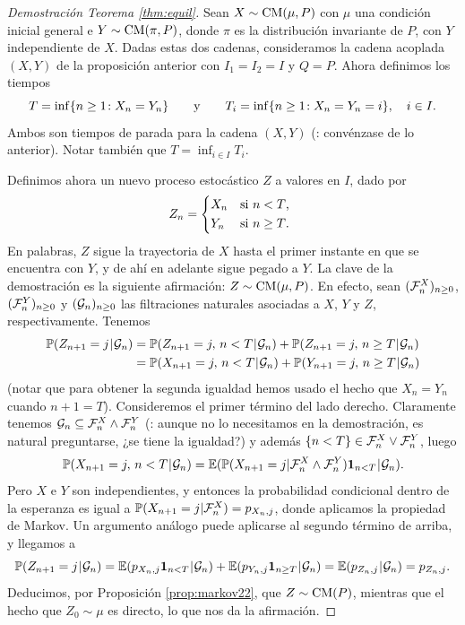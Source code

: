 \begin{proof}[Demostración Teorema \ref{thm:equil}]
Sean $X\sim\text{\upshape{CM}}(\mu,P)$ con $\mu$ una condición inicial general e $Y\sim\text{\upshape{CM}}(\pi,P)$, donde $\pi$ es la distribución invariante de $P$, con $Y$ independiente de $X$.
Dadas estas dos cadenas, consideramos la cadena acoplada $(X,Y)$ de la proposición anterior con $I_1=I_2=I$ y $Q=P$.
Ahora definimos los tiempos
\[T=\inf\{n\geq1\!:X_n=Y_n\}\qquad\text{\upshape{y}}\qquad T_i=\inf\{n\geq1\!:X_n=Y_n=i\},\quad i\in I.\]
Ambos son tiempos de parada para la cadena $(X,Y)$ (\uexers: convénzase de lo anterior).
Notar también que $T=\inf_{i\in I}T_i$.

Definimos ahora un nuevo proceso estocástico $Z$ a valores en $I$, dado por
\[Z_n=\begin{dcases*}
X_n & si $n<T$,\\
Y_n & si $n\geq T$.
\end{dcases*}\]
En palabras, $Z$ sigue la trayectoria de $X$ hasta el primer instante en que se encuentra con $Y$, y de ahí en adelante sigue pegado a $Y$.
La clave de la demostración es la siguiente afirmación: $Z\sim\text{\upshape{CM}}(\mu,P)$.
En efecto, sean $(\mathcal{F}^X_n)_{n\geq0}$, $(\mathcal{F}^Y_n)_{n\geq0}$ y $(\mathcal{G}_n)_{n\geq0}$ las filtraciones naturales asociadas a $X$, $Y$ y $Z$, respectivamente.
Tenemos
\begin{align}
\mathbb{P}(Z_{n+1}=j\hspace{0.05em}|\hspace{0.05em}\mathcal{G}_n)&=\mathbb{P}(Z_{n+1}=j,\,n<T\hspace{0.05em}|\hspace{0.05em}\mathcal{G}_n)+\mathbb{P}(Z_{n+1}=j,\,n\geq T\hspace{0.05em}|\hspace{0.05em}\mathcal{G}_n)\\
&=\mathbb{P}(X_{n+1}=j,\,n<T\hspace{0.05em}|\hspace{0.05em}\mathcal{G}_n)+\mathbb{P}(Y_{n+1}=j,\,n\geq T\hspace{0.05em}|\hspace{0.05em}\mathcal{G}_n)
\end{align}
(notar que para obtener la segunda igualdad hemos usado el hecho que $X_n=Y_n$ cuando $n+1=T$).
Consideremos el primer término del lado derecho.
Claramente tenemos $\mathcal{G}_n\subseteq\mathcal{F}^X_n\wedge\mathcal{F}^Y_n$ (\uexers: aunque no lo necesitamos en la demostración, es natural preguntarse, ¿se tiene la igualdad?) y además $\{n<T\}\in\mathcal{F}^X_n\vee\mathcal{F}^Y_n$, luego 
\[\mathbb{P}(X_{n+1}=j,\,n<T\hspace{0.05em}|\hspace{0.05em}\mathcal{G}_n)=\mathbb{E}(\mathbb{P}(X_{n+1}=j|\mathcal{F}^X_n\wedge\mathcal{F}^Y_n)\mathbf{1}_{n<T}\hspace{0.05em}|\hspace{0.05em}\mathcal{G}_n).\]
Pero $X$ e $Y$ son independientes, y entonces la probabilidad condicional dentro de la esperanza es igual a $\mathbb{P}(X_{n+1}=j|\mathcal{F}^X_n)=p_{X_n,j}$, donde aplicamos la propiedad de Markov.
Un argumento análogo puede aplicarse al segundo término de arriba, y llegamos a
\[\mathbb{P}(Z_{n+1}=j\hspace{0.05em}|\hspace{0.05em}\mathcal{G}_n)=\mathbb{E}(p_{X_n,j}\mathbf{1}_{n<T}\hspace{0.05em}|\hspace{0.05em}\mathcal{G}_n)+\mathbb{E}(p_{Y_n,j}\mathbf{1}_{n\geq T}\hspace{0.05em}|\hspace{0.05em}\mathcal{G}_n)=\mathbb{E}(p_{Z_n,j}\hspace{0.05em}|\hspace{0.05em}\mathcal{G}_n)=p_{Z_n,j}.\]
Deducimos, por Proposición \ref{prop:markov22}, que $Z\sim\text{\upshape{CM}}(P)$, mientras que el hecho que $Z_0\sim\mu$ es directo, lo que nos da la afirmación.


\end{proof}
